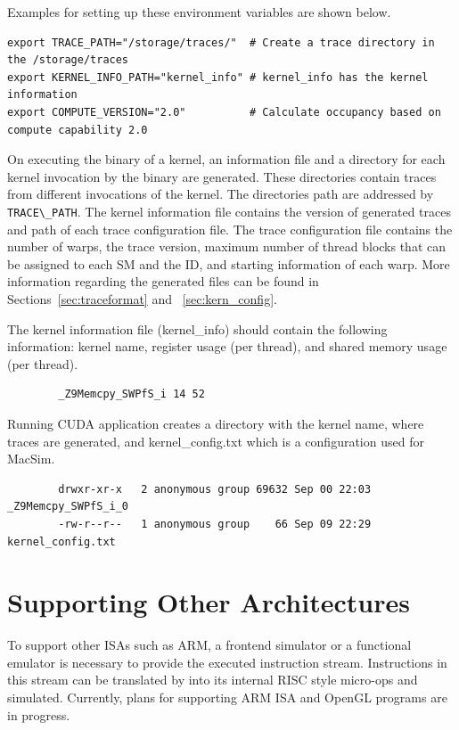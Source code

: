 Examples for setting up these environment variables are shown below.

\begin{Verbatim}
export TRACE_PATH="/storage/traces/"  # Create a trace directory in the /storage/traces
export KERNEL_INFO_PATH="kernel_info" # kernel_info has the kernel information
export COMPUTE_VERSION="2.0"          # Calculate occupancy based on compute capability 2.0
\end{Verbatim}

On executing the binary of a kernel, an information file and a directory for each
kernel invocation by the binary are generated. These directories contain traces from 
different invocations of the kernel. The directories path are addressed by \Verb+TRACE\_PATH+. 
The kernel information file contains the version of generated traces and path of
each trace configuration file. The trace configuration file contains the number of warps, the
trace version, maximum number of thread blocks that can be assigned to each SM
and the ID, and starting information of each warp. More information regarding
the generated files can be found in Sections~\ref{sec:traceformat} and ~\ref{sec:kern_config}. 

\ignore
		{
		The kernel information file (kernel\_info) should contain the following
		information: kernel name, register usage (per thread), and shared memory usage
		(per thread).


		\begin{Verbatim}
		_Z9Memcpy_SWPfS_i 14 52 
		\end{Verbatim}


		Running CUDA application creates a directory with the kernel name, where traces 
		are generated, and kernel\_config.txt which is a configuration used for MacSim.


		\begin{Verbatim}
		drwxr-xr-x   2 anonymous group 69632 Sep 00 22:03 _Z9Memcpy_SWPfS_i_0
		-rw-r--r--   1 anonymous group    66 Sep 09 22:29 kernel_config.txt
		\end{Verbatim}
		}


\section{Supporting Other Architectures}

To support other ISAs such as ARM, a frontend simulator or a
functional emulator is necessary to provide the executed instruction stream. 
Instructions in this stream can be translated by \SIM into
its internal RISC style micro-ops and simulated. Currently, plans for
supporting ARM ISA and OpenGL programs are in progress.


